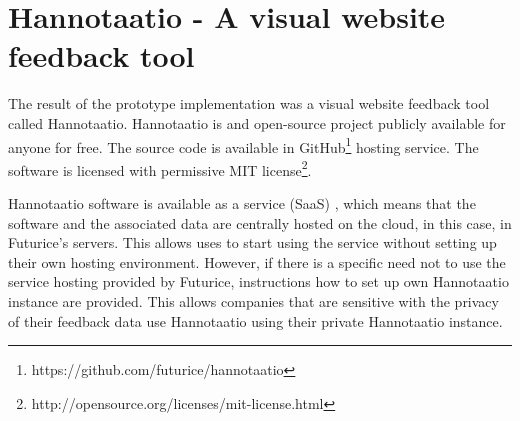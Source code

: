 \documentclass[english,12pt,a4paper,pdftex]{article}
\begin{document}
\clearpage

\section{Hannotaatio - A visual website feedback tool}
\label{sec:hannotaatio}
\acresetall

The result of the prototype implementation was a visual website feedback tool called Hannotaatio. Hannotaatio is and open-source project publicly available for anyone for free. The source code is available in GitHub\footnote{https://github.com/futurice/hannotaatio} hosting service. The software is licensed with permissive MIT license\footnote{http://opensource.org/licenses/mit-license.html}.

Hannotaatio software is available as a service (SaaS) \citep{saas}, which means that the software and the associated data are centrally hosted on the cloud, in this case, in Futurice's servers. This allows uses to start using the service without setting up their own hosting environment. However, if there is a specific need not to use the service hosting provided by Futurice, instructions how to set up own Hannotaatio instance are provided. This allows companies that are sensitive with the privacy of their feedback data use Hannotaatio using their private Hannotaatio instance.
\end{document}

